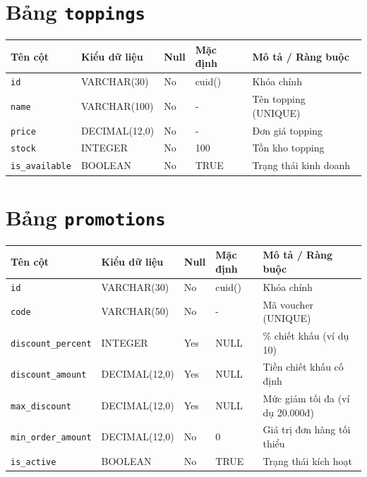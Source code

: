 \section{Bảng \texttt{toppings}}
\begin{table}[htbp]
\centering
\small
\begin{tabularx}{\textwidth}{llllX}
\toprule
\textbf{Tên cột} & \textbf{Kiểu dữ liệu} & \textbf{Null} & \textbf{Mặc định} & \textbf{Mô tả / Ràng buộc} \\
\midrule
\texttt{id} & VARCHAR(30) & No & cuid() & Khóa chính \\
\texttt{name} & VARCHAR(100) & No & - & Tên topping (UNIQUE) \\
\texttt{price} & DECIMAL(12,0) & No & - & Đơn giá topping \\
\texttt{stock} & INTEGER & No & 100 & Tồn kho topping \\
\texttt{is\_available} & BOOLEAN & No & TRUE & Trạng thái kinh doanh \\
\bottomrule
\end{tabularx}
\end{table}

\section{Bảng \texttt{promotions}}
\begin{table}[htbp]
\centering
\small
\begin{tabularx}{\textwidth}{llllX}
\toprule
\textbf{Tên cột} & \textbf{Kiểu dữ liệu} & \textbf{Null} & \textbf{Mặc định} & \textbf{Mô tả / Ràng buộc} \\
\midrule
\texttt{id} & VARCHAR(30) & No & cuid() & Khóa chính \\
\texttt{code} & VARCHAR(50) & No & - & Mã voucher (UNIQUE) \\
\texttt{discount\_percent} & INTEGER & Yes & NULL & \% chiết khấu (ví dụ 10) \\
\texttt{discount\_amount} & DECIMAL(12,0) & Yes & NULL & Tiền chiết khấu cố định \\
\texttt{max\_discount} & DECIMAL(12,0) & Yes & NULL & Mức giảm tối đa (ví dụ 20.000đ) \\
\texttt{min\_order\_amount} & DECIMAL(12,0) & No & 0 & Giá trị đơn hàng tối thiểu \\
\texttt{is\_active} & BOOLEAN & No & TRUE & Trạng thái kích hoạt \\
\bottomrule
\end{tabularx}
\end{table}

